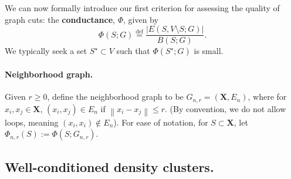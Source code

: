 \documentclass{article}
\newcommand{\defeq}{\overset{\mathrm{def}}{=}}
\newcommand{\abs}[1]{\left \lvert #1 \right \rvert}
\newcommand{\norm}[1]{\left\lVert#1\right\rVert}
\newcommand{\1}{\mathbf{1}}
\theoremstyle{aldenthm}
\theoremstyle{remark}
\begin{document}
We can now formally introduce our first criterion for assessing the quality of graph cuts: the \textbf{conductance}, $\Phi$, given by
\begin{equation}
\label{eqn: conductance}
\Phi(S; G) \defeq \frac{\abs{E(S, V \setminus S; G)}}{B(S; G)}.
\end{equation}
We typically seek a set $S^{\star} \subset V$ such that $\Phi(S^{\star}; G)$ is small. 

\paragraph{Neighborhood graph.}

Given $r \geq 0$, define the neighborhood graph to be $G_{n,r} = (\mathbf{X}, E_n)$, where for $x_i, x_j \in \mathbf{X}$, $(x_i, x_j) \in E_n$ if $\norm{x_i - x_j} \leq r$. (By convention, we do not allow loops, meaning $(x_i, x_i) \not\in E_n$). For ease of notation, for $S \subset \mathbf{X}$, let $\Phi_{n,r}(S) := \Phi(S; G_{n,r})$.

\subsection{Well-conditioned density clusters.}
\end{document}
